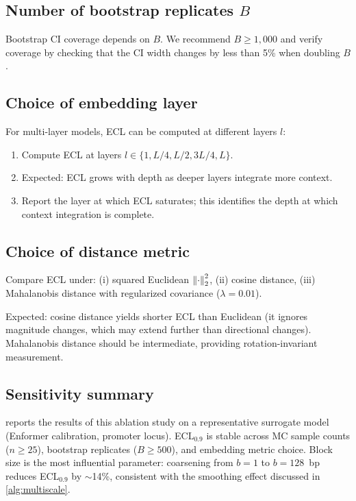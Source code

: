 \subsection{Number of bootstrap replicates $B$}

Bootstrap CI coverage depends on $B$. We recommend $B \ge 1{,}000$ and verify coverage by checking that the CI width changes by less than 5\% when doubling $B$.

\subsection{Choice of embedding layer}

For multi-layer models, ECL can be computed at different layers $l$:
\begin{enumerate}[leftmargin=2em, label=(\roman*)]
\item Compute ECL at layers $l \in \{1, L/4, L/2, 3L/4, L\}$.
\item Expected: ECL grows with depth as deeper layers integrate more context.
\item Report the layer at which ECL saturates; this identifies the depth at which context integration is complete.
\end{enumerate}

\subsection{Choice of distance metric}

Compare ECL under: (i) squared Euclidean $\left\lVert \cdot \right\rVert_2^2$, (ii) cosine distance, (iii) Mahalanobis distance with regularized covariance ($\lambda = 0.01$).

Expected: cosine distance yields shorter ECL than Euclidean (it ignores magnitude changes, which may extend further than directional changes). Mahalanobis distance should be intermediate, providing rotation-invariant measurement.

\subsection{Sensitivity summary}

 reports the results of this ablation study on a representative surrogate model (Enformer calibration, promoter locus). ECL$_{0.9}$ is stable across MC sample counts ($n \ge 25$), bootstrap replicates ($B \ge 500$), and embedding metric choice. Block size is the most influential parameter: coarsening from $b=1$ to $b=128$~bp reduces ECL$_{0.9}$ by $\sim$14\%, consistent with the smoothing effect discussed in \cref{alg:multiscale}.


